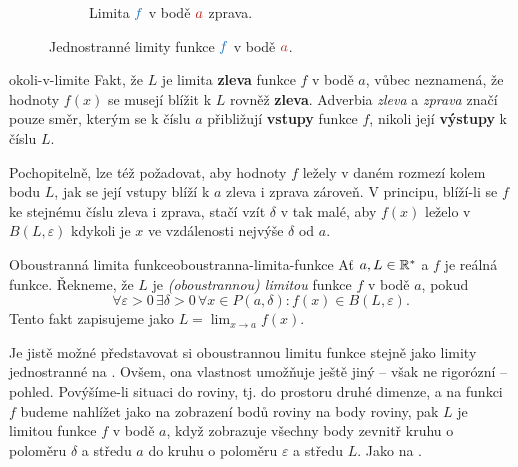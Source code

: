 \begin{figure}[ht]
\begin{subfigure}[b]{.49\textwidth}
  \caption{Limita $\clb{f}$ v bodě $\clr{a}$ zprava.}
 \end{subfigure}
 \caption{Jednostranné limity funkce $\clb{f}$ v bodě $\clr{a}$.}
 \label{fig:jednostranna-limita-funkce}
\end{figure}

\begin{warning}{}{okoli-v-limite}
 Fakt, že $L$ je limita \textbf{zleva} funkce $f$ v bodě $a$, vůbec neznamená,
 že hodnoty $f(x)$ se musejí blížit k $L$ rovněž \textbf{zleva}. Adverbia
 \emph{zleva} a \emph{zprava} značí pouze směr, kterým se k číslu $a$ přibližují
 \textbf{vstupy} funkce $f$, nikoli její \textbf{výstupy} k číslu $L$.
\end{warning}

Pochopitelně, lze též požadovat, aby hodnoty $f$ ležely v daném rozmezí kolem
bodu $L$, jak se její vstupy blíží k $a$ zleva i zprava zároveň. V principu,
blíží-li se $f$ ke stejnému číslu zleva i zprava, stačí vzít $\delta$ v
 tak malé, aby $f(x)$ leželo v
$B(L,\varepsilon)$ kdykoli je $x$ ve vzdálenosti nejvýše $\delta$ od $a$.

\begin{definition}{Oboustranná limita funkce}{oboustranna-limita-funkce}
 Ať $a,L \in \mathbb{R}^{*}$ a $f$ je reálná funkce. Řekneme, že $L$ je
 \emph{(oboustrannou) limitou} funkce $f$ v bodě $a$, pokud
 \[
 \forall \varepsilon > 0 \, \exists \delta > 0 \, \forall x \in P(a,\delta):
 f(x) \in B(L,\varepsilon).
 \]
 Tento fakt zapisujeme jako $L = \lim_{x \to a} f(x)$.
\end{definition}

Je jistě možné představovat si oboustrannou limitu funkce stejně jako limity
jednostranné na . Ovšem, ona
vlastnost  umožňuje ještě jiný -- však ne rigorózní --
pohled. Povýšíme-li situaci do roviny, tj. do prostoru druhé dimenze, a na
funkci $f$ budeme nahlížet jako na zobrazení bodů roviny na body roviny, pak $L$
je limitou funkce $f$ v bodě $a$, když zobrazuje všechny body zevnitř kruhu o
poloměru $\delta$ a středu $a$ do kruhu o poloměru $\varepsilon$ a středu $L$.
Jako na .

